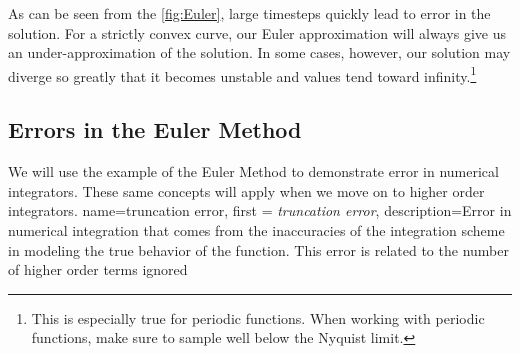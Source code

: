 \documentclass[12pt]{report}
\begin{document}
{As can be seen from the \ref{fig:Euler}, large timesteps quickly lead to error in the solution. For a strictly convex curve, our Euler approximation will always give us an under-approximation of the solution. In some cases, however, our solution may diverge so greatly that it becomes unstable and values tend toward infinity.\footnote{This is especially true for periodic functions. When working with periodic functions, make sure to sample well below the Nyquist limit.}
 


\subsection{Errors in the Euler Method}\label{sec:errors in the euler method}
We will use the example of the Euler Method to demonstrate error in numerical integrators. These same concepts will apply when we move on to higher order integrators. 
{
    name=truncation error,
    first = {\textit{truncation error}},
    description={Error in numerical integration that comes from the inaccuracies of the integration scheme in modeling the true behavior of the function. This error is related to the number of higher order terms ignored}
}

}
\end{document}
